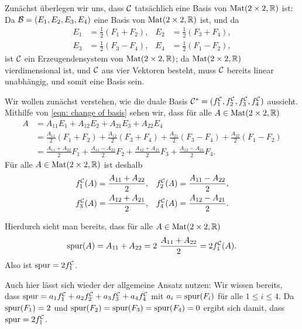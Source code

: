 \documentclass[a4paper,10pt]{article}
\begin{document}
Zunächst überlegen wir uns, dass $\mathcal{C}$ tatsächlich eine Basis von $\mathrm{Mat}(2 \times 2, \mathbb{R})$ ist: Da $\mathcal{B} = (E_1, E_2, E_3, E_4)$ eine Basis von $\mathrm{Mat}(2 \times 2, \mathbb{R})$ ist, und da
\begin{equation}\label{eqn: change of basis}
 \begin{aligned}
  E_1 &= \frac{1}{2}(F_1+F_2), &
  E_2 &= \frac{1}{2}(F_3+F_4), \\
  E_3 &= \frac{1}{2}(F_3-F_4), &
  E_4 &= \frac{1}{2}(F_1-F_2),
 \end{aligned}
\end{equation}
ist $\mathcal{C}$ ein Erzeugendensystem von $\mathrm{Mat}(2 \times 2, \mathbb{R})$; da $\mathrm{Mat}(2 \times 2, \mathbb{R})$ vierdimensional ist, und $\mathcal{C}$ aus vier Vektoren besteht, muss $\mathcal{C}$ bereits linear unabhängig, und somit eine Basis sein.

Wir wollen zunächst verstehen, wie die duale Basis $\mathcal{C}^* = (f^{\mathcal{C}}_1, f^{\mathcal{C}}_2, f^{\mathcal{C}}_3, f^{\mathcal{C}}_4)$ aussieht. Mithilfe von \eqref{eqn: change of basis} sehen wir, dass für alle $A \in \mathrm{Mat}(2 \times 2, \mathbb{R})$
\begin{align*}
 A
 &= A_{11} E_1 + A_{12} E_2 + A_{21} E_3 + A_{22} E_4 \\
 &= \frac{A_{11}}{2} (F_1 + F_2) + \frac{A_{12}}{2} (F_3 + F_4)
   + \frac{A_{21}}{2} (F_3 - F_4) + \frac{A_{22}}{2} (F_1 - F_2) \\
 &= \frac{A_{11}+A_{22}}{2} F_1 + \frac{A_{11}-A_{22}}{2} F_2 + \frac{A_{12}+A_{21}}{2} F_3 + \frac{A_{12}-A_{21}}{2} F_4.
\end{align*}
Für alle $A \in \mathrm{Mat}(2 \times 2, \mathbb{R})$ ist deshalb
\begin{equation*}
 \begin{aligned}
  f^{\mathcal{C}}_1(A) &= \frac{A_{11}+A_{22}}{2}, &
  f^{\mathcal{C}}_2(A) &= \frac{A_{11}-A_{22}}{2}, \\
  f^{\mathcal{C}}_3(A) &= \frac{A_{12}+A_{21}}{2}, &
  f^{\mathcal{C}}_4(A) &= \frac{A_{12}-A_{21}}{2}.
 \end{aligned}
\end{equation*}

Hierdurch sieht man bereits, dass für alle $A \in \mathrm{Mat}(2 \times 2, \mathbb{R})$
\[
 \mathrm{spur}(A)
 = A_{11} + A_{22}
 = 2 \ \frac{A_{11} + A_{22}}{2}
 = 2 f^{\mathcal{C}}_1(A).
\]
Also ist $\mathrm{spur} = 2f^{\mathcal{C}}_1$. 

Auch hier lässt sich wieder der allgemeine Ansatz nutzen: Wir wissen bereits, dass $\mathrm{spur} = a_1 f^{\mathcal{C}}_1 + a_2 f^{\mathcal{C}}_2 + a_3 f^{\mathcal{C}}_3 + a_4 f^{\mathcal{C}}_4$ mit $a_i = \mathrm{spur}(F_i)$ für alle $1 \leq i \leq 4$. Da $\mathrm{spur}(F_1) = 2$ und $\mathrm{spur}(F_2) = \mathrm{spur}(F_3) = \mathrm{spur}(F_4) = 0$ ergibt sich damit, dass $\mathrm{spur} = 2 f^{\mathcal{C}}_1$.
\end{document}
